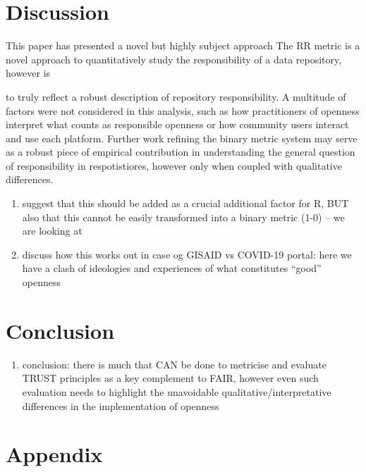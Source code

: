 \documentclass{article}
\providecommand{\tightlist}{%
  \setlength{\itemsep}{0pt}\setlength{\parskip}{0pt}}
\begin{document}
\hypertarget{discussion}{%
\section{Discussion}\label{discussion}}

This paper has presented a novel but highly subject approach The RR
metric is a novel approach to quantitatively study the responsibility of
a data repository, however is

to truly reflect a robust description of repository responsibility. A
multitude of factors were not considered in this analysis, such as how
practitioners of openness interpret what counts as responsible openness
or how community users interact and use each platform. Further work
refining the binary metric system may serve as a robust piece of
empirical contribution in understanding the general question of
responsibility in respotistiores, however only when coupled with
qualitative differences.

\begin{enumerate}
\def\labelenumi{(\arabic{enumi})}
\setcounter{enumi}{3}
\item
  suggest that this should be added as a crucial additional factor for
  R, BUT also that this cannot be easily transformed into a binary
  metric (1-0) -- we are looking at
\item
  discuss how this works out in case og GISAID vs COVID-19 portal: here
  we have a clash of ideologies and experiences of what constitutes
  ``good'' openness
\end{enumerate}

\hypertarget{conclusion}{%
\section{Conclusion}\label{conclusion}}

\begin{enumerate}
\def\labelenumi{(\arabic{enumi})}
\setcounter{enumi}{5}
\tightlist
\item
  conclusion: there is much that CAN be done to metricise and evaluate
  TRUST principles as a key complement to FAIR, however even such
  evaluation needs to highlight the unavoidable
  qualitative/interpretative differences in the implementation of
  openness
\end{enumerate}

\hypertarget{appendix}{%
\section{Appendix}\label{appendix}}
\end{document}
